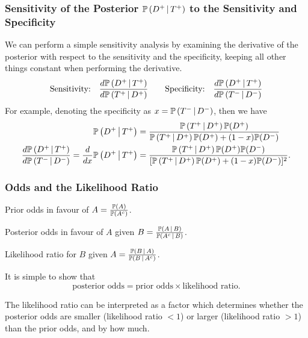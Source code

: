\documentclass[10pt, a4paper]{article}
\newcommand{\cP}[2]{\P\left(#1 \mmid #2\right)}
\begin{document}
\subsubsection{Sensitivity of the Posterior \texorpdfstring{$\P\left(D ^ {+} \mmid T ^ {+}\right)$}{} to the Sensitivity and Specificity}

We can perform a simple sensitivity analysis by examining the derivative of the posterior with respect to the sensitivity and the specificity,
keeping all other things constant when performing the derivative.
\[
\text{Sensitivity:}\quad\frac{d\P\left(D ^ {+} \mmid T ^ {+}\right)}{d\P\left(T ^ {+} \mmid D ^ {+}\right)}\qquad\text{Specificity:}\quad\frac{d\P\left(D ^ {+} \mmid T ^ {+}\right)}{d\P\left(T ^ {-} \mmid D ^ {-}\right)}
\]
For example,
denoting the specificity as $x = \P\left(T ^ {-} \mmid D ^ {-}\right)$,
then we have
\begin{align*}
    \P\left(D ^ {+} \mmid T ^ {+}\right) &= \frac{\cP{T ^ {+}}{D ^ {+}}\P(D ^ {+})}{\cP{T ^ {+}}{D ^ {+}}\P(D ^ {+}) + (1 - x)\P(D ^ {-})} \\
    \frac{d\P\left(D ^ {+} \mmid T ^ {+}\right)}{d\P\left(T ^ {-} \mmid D ^ {-}\right)} = \frac{d}{dx}\cP{D ^ {+}}{T ^ {+}} &= \frac{\cP{T ^ {+}}{D ^ {+}}\P(D ^ {+})\P(D ^ {-})}{[\cP{T ^ {+}}{D ^ {+}}\P(D ^ {+}) + (1 - x)\P(D ^ {-})] ^ 2}.
\end{align*}

\subsubsection{Odds and the Likelihood Ratio}
\begin{definition}
    Prior odds in favour of $A = \frac{\P(A)}{\P(A ^ c)}$.

    Posterior odds in favour of $A$ given $B = \frac{\cP{A}{B}}{\cP{A ^ c}{B}}$.

    Likelihood ratio for $B$ given $A = \frac{\cP{B}{A}}{\cP{B}{A ^ c}}$.

    It is simple to show that
    \[
    \text{posterior odds} = \text{prior odds} \times \text{likelihood ratio}.
    \]
\end{definition}

The likelihood ratio can be interpreted as a factor which determines whether the posterior odds are smaller
(likelihood ratio $< 1$)
or larger
(likelihood ratio $> 1$)
than the prior odds,
and by how much.

\newpage
\end{document}
